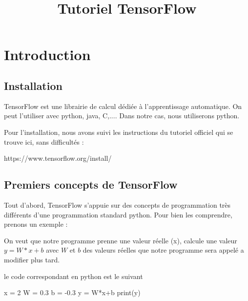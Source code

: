 \documentclass[a4paper,11pt]{book}
\theoremstyle{theo}
\begin{document}
\let\cleardoublepage\clearpage
\title{  Tutoriel TensorFlow}





\maketitle

\newpage

\tableofcontents
\newpage
\chapter{Introduction }

\section{Installation}
TensorFlow est une librairie de calcul dédiée à l'apprentissage automatique. On peut l'utiliser avec python, java, C,.... Dans notre cas, nous utiliserons python.


Pour l'installation, nous avons suivi les instructions du tutoriel officiel qui se trouve ici, sans difficultés :

https://www.tensorflow.org/install/


\section{Premiers concepts de TensorFlow}

Tout d'abord, TensorFlow s'appuie sur des concepts de programmation très différents d'une programmation standard python. Pour bien les comprendre, prenons un exemple :


On veut que notre programme prenne une valeur réelle (x), calcule une valeur  $y = W*x+b$ avec $W$ et $b$ des valeurs réelles que notre programme sera appelé a modifier plus tard.

le code correspondant en python est le suivant
\begin{mypython}
x = 2
W = 0.3
b = -0.3
y = W*x+b
print(y)
\end{mypython}
\end{document}
